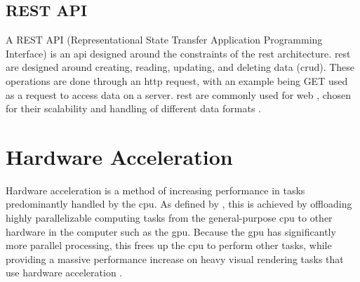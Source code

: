\subsection{REST API}
\label{sec: rest api}
A REST API (Representational State Transfer Application Programming Interface) is an \acrshort{api} designed around the constraints of the \acrshort{rest} architecture. \acrshort{rest}  are designed around creating, reading, updating, and deleting data (\acrshort{crud}). These operations are done through an \acrshort{http} request, with an example being GET used as a request to access data on a server. \acrshort{rest}  are commonly used for web , chosen for their scalability and handling of different data formats \parencite{ibm_rest_api}.

\section{Hardware Acceleration}
\label{sec:hardware_acceleration}


Hardware acceleration is a method of increasing performance in tasks predominantly handled by the \acrfull{cpu}. As defined by \textcite{sciencedirect_hardware_acceleration}, this is achieved by offloading highly parallelizable computing tasks from the general-purpose \acrshort{cpu} to other hardware in the computer such as the \acrfull{gpu}. Because the \acrshort{gpu} has significantly more parallel processing, this frees up the \acrshort{cpu} to perform other tasks, while providing a massive performance increase on heavy visual rendering tasks that use hardware acceleration \parencite{sciencedirect_hardware_acceleration}.
 


